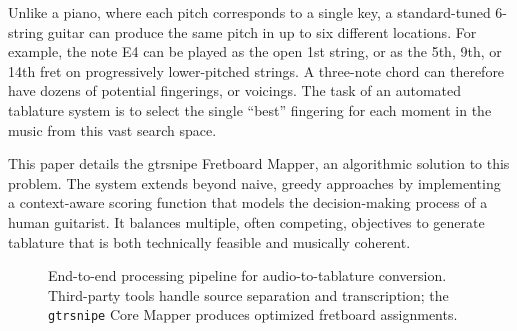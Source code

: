 \documentclass[conference]{IEEEtran}
\begin{document}
Unlike a piano, where each pitch corresponds to a single key, a standard-tuned 6-string guitar can produce the same pitch in up to six different locations. For example, the note E4 can be played as the open 1st string, or as the 5th, 9th, or 14th fret on progressively lower-pitched strings. A three-note chord can therefore have dozens of potential fingerings, or voicings. The task of an automated tablature system is to select the single ``best'' fingering for each moment in the music from this vast search space.

This paper details the gtrsnipe Fretboard Mapper, an algorithmic solution to this problem. The system extends beyond naive, greedy approaches by implementing a context-aware scoring function that models the decision-making process of a human guitarist. It balances multiple, often competing, objectives to generate tablature that is both technically feasible and musically coherent.

\begin{figure}[htbp]
\centering
{}
\caption[ ]{End-to-end processing pipeline for audio-to-tablature conversion. Third-party tools handle source separation and transcription; the \texttt{gtrsnipe} Core Mapper produces optimized fretboard assignments.}
\label{fig:gtrsnipe_pipeline}
\end{figure}
\end{document}
